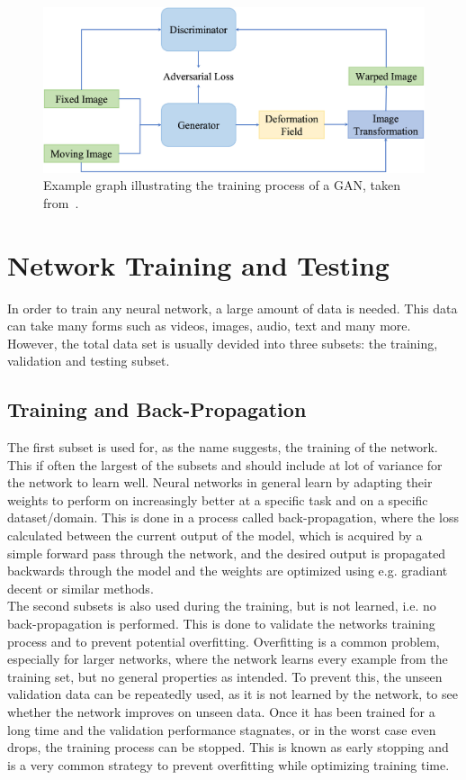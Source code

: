 \documentclass[english,version-2022-01]{uzl-thesis} %
\begin{document}
\begin{figure}[h] %
	\centering
	\graphicspath{{images/}{\main/images/}}
	\includegraphics[width=\linewidth]{GANRegistrationGraph.jpg} 
	\caption{Example graph illustrating the training process of a GAN, taken from~\cite{Zou2022}.}
	\label{fig:GANRegistration}
\end{figure}

\section{Network Training and Testing} \label{Sec:NetworkTrainingAndTesting}
In order to train any neural network, a large amount of data is needed. This data can take many forms such as videos, images, audio, text and many more. However, the total data set is usually devided into three subsets: the training, validation and testing subset. 

\subsection{Training and Back-Propagation}
The first subset is used for, as the name suggests, the training of the network. This if often the largest of the subsets and should include at lot of variance for the network to learn well. Neural networks in general learn by adapting their weights to perform on increasingly better at a specific task and on a specific dataset/domain. This is done in a process called back-propagation, where the loss calculated between the current output of the model, which is acquired by a simple forward pass through the network, and the desired output is propagated backwards through the model and the weights are optimized using e.g. gradiant decent or similar methods. \\
The second subsets is also used during the training, but is not learned, i.e. no back-propagation is performed. This is done to validate the networks training process and to prevent potential overfitting. Overfitting is a common problem, especially for larger networks, where the network learns every example from the training set, but no general properties as intended. To prevent this, the unseen validation data can be repeatedly used, as it is not learned by the network, to see whether the network improves on unseen data. Once it has been trained for a long time and the validation performance stagnates, or in the worst case even drops, the training process can be stopped. This is known as early stopping and is a very common strategy to prevent overfitting while optimizing training time.\\
\end{document}
